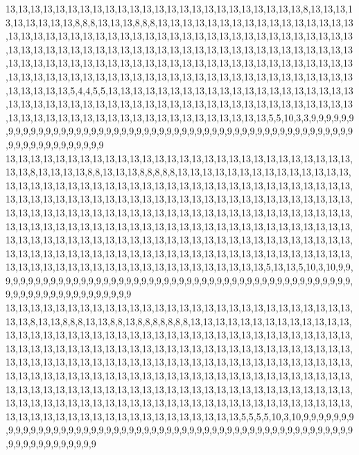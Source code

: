 13,13,13,13,13,13,13,13,13,13,13,13,13,13,13,13,13,13,13,13,13,13,13,13,8,13,13,13,13,13,13,13,13,13,8,8,8,13,13,13,8,8,8,13,13,13,13,13,13,13,13,13,13,13,13,13,13,13,13,13,13,13,13,13,13,13,13,13,13,13,13,13,13,13,13,13,13,13,13,13,13,13,13,13,13,13,13,13,13,13,13,13,13,13,13,13,13,13,13,13,13,13,13,13,13,13,13,13,13,13,13,13,13,13,13,13,13,13,13,13,13,13,13,13,13,13,13,13,13,13,13,13,13,13,13,13,13,13,13,13,13,13,13,13,13,13,13,13,13,13,13,13,13,13,13,13,13,13,13,13,13,13,13,13,13,13,13,13,13,13,13,13,13,13,13,13,5,4,4,5,5,13,13,13,13,13,13,13,13,13,13,13,13,13,13,13,13,13,13,13,13,13,13,13,13,13,13,13,13,13,13,13,13,13,13,13,13,13,13,13,13,13,13,13,13,13,13,13,13,13,13,13,13,13,13,13,13,13,13,13,13,13,13,13,13,13,13,13,13,13,5,5,10,3,3,9,9,9,9,9,9,9,9,9,9,9,9,9,9,9,9,9,9,9,9,9,9,9,9,9,9,9,9,9,9,9,9,9,9,9,9,9,9,9,9,9,9,9,9,9,9,9,9,9,9,9,9,9,9,9,9,9,9,9,9,9,9,9,9,9
13,13,13,13,13,13,13,13,13,13,13,13,13,13,13,13,13,13,13,13,13,13,13,13,13,13,13,13,13,13,8,13,13,13,13,8,8,13,13,13,8,8,8,8,8,13,13,13,13,13,13,13,13,13,13,13,13,13,13,13,13,13,13,13,13,13,13,13,13,13,13,13,13,13,13,13,13,13,13,13,13,13,13,13,13,13,13,13,13,13,13,13,13,13,13,13,13,13,13,13,13,13,13,13,13,13,13,13,13,13,13,13,13,13,13,13,13,13,13,13,13,13,13,13,13,13,13,13,13,13,13,13,13,13,13,13,13,13,13,13,13,13,13,13,13,13,13,13,13,13,13,13,13,13,13,13,13,13,13,13,13,13,13,13,13,13,13,13,13,13,13,13,13,13,13,13,13,13,13,13,13,13,13,13,13,13,13,13,13,13,13,13,13,13,13,13,13,13,13,13,13,13,13,13,13,13,13,13,13,13,13,13,13,13,13,13,13,13,13,13,13,13,13,13,13,13,13,13,13,13,13,13,13,13,13,13,13,13,13,13,13,13,13,13,13,13,13,13,5,13,13,5,10,3,10,9,9,9,9,9,9,9,9,9,9,9,9,9,9,9,9,9,9,9,9,9,9,9,9,9,9,9,9,9,9,9,9,9,9,9,9,9,9,9,9,9,9,9,9,9,9,9,9,9,9,9,9,9,9,9,9,9,9,9,9,9,9,9,9,9
13,13,13,13,13,13,13,13,13,13,13,13,13,13,13,13,13,13,13,13,13,13,13,13,13,13,13,13,13,13,8,13,13,8,8,8,13,13,8,8,13,8,8,8,8,8,8,8,13,13,13,13,13,13,13,13,13,13,13,13,13,13,13,13,13,13,13,13,13,13,13,13,13,13,13,13,13,13,13,13,13,13,13,13,13,13,13,13,13,13,13,13,13,13,13,13,13,13,13,13,13,13,13,13,13,13,13,13,13,13,13,13,13,13,13,13,13,13,13,13,13,13,13,13,13,13,13,13,13,13,13,13,13,13,13,13,13,13,13,13,13,13,13,13,13,13,13,13,13,13,13,13,13,13,13,13,13,13,13,13,13,13,13,13,13,13,13,13,13,13,13,13,13,13,13,13,13,13,13,13,13,13,13,13,13,13,13,13,13,13,13,13,13,13,13,13,13,13,13,13,13,13,13,13,13,13,13,13,13,13,13,13,13,13,13,13,13,13,13,13,13,13,13,13,13,13,13,13,13,13,13,13,13,13,13,13,13,13,13,13,13,13,13,13,13,13,13,13,5,5,5,5,10,3,10,9,9,9,9,9,9,9,9,9,9,9,9,9,9,9,9,9,9,9,9,9,9,9,9,9,9,9,9,9,9,9,9,9,9,9,9,9,9,9,9,9,9,9,9,9,9,9,9,9,9,9,9,9,9,9,9,9,9,9,9,9,9,9,9,9
